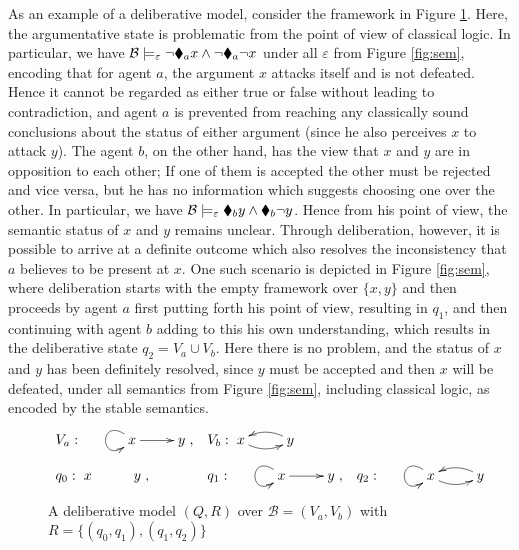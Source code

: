 \documentclass[greybox]{svmult}
\newcommand{\views}{\mathcal B}
\newcommand{\sem}{\varepsilon}
\begin{document}
As an example of a deliberative model, consider the framework in Figure \ref{fig:del1}. Here, the argumentative state is problematic from the point of view of classical logic. In particular, we have $\views \models_\sem \neg \cdia_a x \land \neg \cdia_a \neg x$ under all $\sem$ from Figure \ref{fig:sem}, encoding that for agent $a$, the argument $x$ attacks itself and is not defeated. Hence it cannot be regarded as either true or false without leading to contradiction, and agent $a$ is prevented from reaching any classically sound conclusions about the status of either argument (since he also perceives $x$ to attack $y$). The agent $b$, on the other hand, has the view that $x$ and $y$ are in opposition to each other; If one of them is accepted the other must be rejected and vice versa, but he has no information which suggests choosing one over the other. In particular, we have $\views \models_\sem \cdia_b y \land \cdia_b \neg y$. Hence from his point of view, the semantic status of $x$ and $y$ remains unclear. Through deliberation, however, it is possible to arrive at a definite outcome which also resolves the inconsistency that $a$ believes to be present at $x$. One such scenario is depicted in Figure \ref{fig:sem}, where deliberation starts with the empty framework over $\{x,y\}$ and then proceeds by agent $a$ first putting forth his point of view, resulting in $q_1$, and then continuing with agent $b$ adding to this his own understanding, which results in the deliberative state $q_2 = V_a \cup V_b$. Here there is no problem, and the status of $x$ and $y$ has been definitely resolved, since $y$ must be accepted and then $x$ will be defeated, under all semantics from Figure \ref{fig:sem}, including classical logic, as encoded by the stable semantics.

\begin{figure}\label{fig:del1}
$\begin{array}{llllll}
V_a: \xymatrix{& x \ar[r] \ar@(lu,ld) & y}, & V_b: \xymatrix{x \ar@/_/[r] & y \ar@/_/[l] } \\ \\
q_0: \xymatrix{ x & y }, & q_1: \xymatrix{& x \ar@(lu,ld)  \ar[r] & y }, & q_2: \xymatrix{&  x \ar@(lu,ld)  \ar@/_/[r] & y \ar@/_/[l]}
\end{array}$
\caption{A deliberative model $(Q,R)$ over $\views = (V_a,V_b)$ with $R = \{(q_0,q_1),(q_1,q_2)\}$}
\end{figure}
\end{document}
